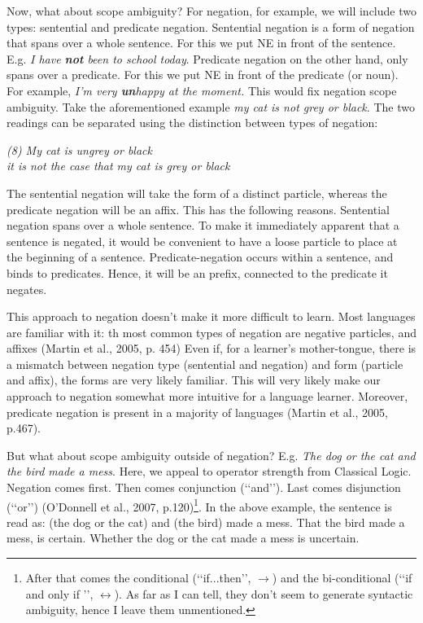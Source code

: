 Now, what about scope ambiguity? For negation, for example, we will include two types: sentential and predicate negation. Sentential negation is a form of negation that spans over a whole sentence. For this we put NE in front of the sentence. E.g. {\it I have {\bf not} been to school today}. Predicate negation on the other hand, only spans over a predicate. For this we put NE in front of the predicate (or noun). For example, {\it I'm very {\bf un}happy at the moment.} This would fix negation scope ambiguity. Take the aforementioned example {\it my cat is not grey or black}. The two readings can be separated using the distinction between types of negation:

\begin{center}
	{\it (8) My cat is ungrey or black\\ it is not the case that my cat is grey or black}
\end{center}


\noindent The sentential negation will take the form of a distinct particle, whereas the predicate negation will be an affix. This has the following reasons. Sentential negation spans over a whole sentence. To make it immediately apparent that a sentence is negated, it would be convenient to have a loose particle to place at the beginning of a sentence. Predicate-negation occurs within a sentence, and binds to predicates. Hence, it will be an prefix, connected to the predicate it negates.  

This approach to negation doesn't make it more difficult to learn. Most languages are familiar with it: th most common types of negation are negative particles, and affixes (Martin et al., 2005, p. 454) Even if, for a learner's mother-tongue, there is a mismatch between negation type (sentential and negation) and form (particle and affix), the forms are very likely familiar. This will very likely make our approach to negation somewhat more intuitive for a language learner. Moreover, predicate negation is present in a majority of languages (Martin et al., 2005, p.467).

But what about scope ambiguity outside of negation? E.g. {\it The dog or the cat and the bird made a mess}. Here, we appeal to operator strength from Classical Logic. Negation comes first. Then comes conjunction (\lq\lq and\rq\rq). Last comes disjunction (\lq\lq or\rq\rq) (O'Donnell et al., 2007, p.120)\footnote{After that comes the conditional (\lq\lq if...then\rq\rq, $\rightarrow$) and the bi-conditional (\lq\lq if and only if \rq\rq, $\leftrightarrow$). As far as I can tell, they don't seem to generate syntactic ambiguity, hence I leave them unmentioned.}. In the above example, the sentence is read as: (the dog or the cat) and (the bird) made a mess. That the bird made a mess, is certain. Whether the dog or the cat made a mess is uncertain.



